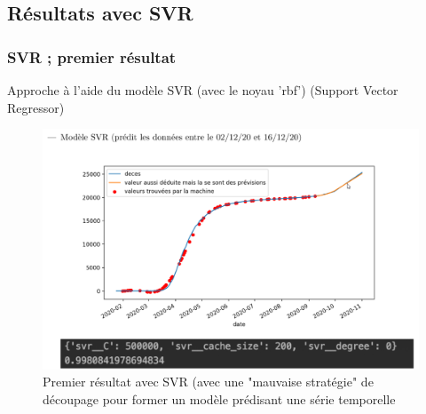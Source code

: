 \documentclass{beamer}
\begin{document}
\subsection{Résultats avec SVR}
\begin{frame}
	\frametitle{SVR ; premier résultat}
	Approche à l'aide du modèle SVR (avec le noyau 'rbf') (Support Vector Regressor)
	\begin{figure}[tc]
		\includegraphics[scale=0.2]{SVR_premierdecoup}
		\centering
		\caption{Premier résultat avec SVR (avec une "mauvaise stratégie" de découpage pour former un modèle prédisant une série temporelle}
	\end{figure}
\end{frame}
\end{document}

